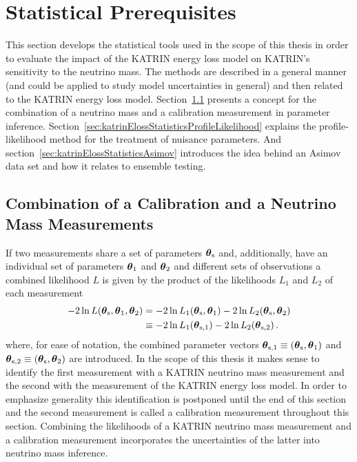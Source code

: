 \def\currentRootFolder{chapter/sensitivityStudyWithPreliminaryKatrinElossModel/statisticalPrerequisites}
\def\currentFigureFolder{\currentRootFolder/fig}



\section{Statistical Prerequisites}
\label{sec:katrinElossStatistics}
This section develops the statistical tools used in the scope of this thesis in order to evaluate the impact of the KATRIN energy loss model on KATRIN's sensitivity to the neutrino mass. The methods are described in a general manner (and could be applied to study model uncertainties in general) and then related to the KATRIN energy loss model. Section~\ref{sec:katrinElossStatisticsCombMeasurements} presents a concept for the combination of a neutrino mass and a calibration measurement in parameter inference. Section~\ref{sec:katrinElossStatisticsProfileLikelihood} explains the profile-likelihood method for the treatment of nuisance parameters. And section~\ref{sec:katrinElossStatisticsAsimov} introduces the idea behind an Asimov data set and how it relates to ensemble testing.

\subsection{Combination of a Calibration and a Neutrino Mass Measurements}
\label{sec:katrinElossStatisticsCombMeasurements}
If two measurements share a set of parameters $\boldsymbol{\mathbf{\theta}}_\mathrm{s}$ and, additionally, have an individual set of parameters $\boldsymbol{\mathbf{\theta}}_1$ and $\boldsymbol{\mathbf{\theta}}_2$ and different sets of observations a combined likelihood $L$ is given by the product of the likelihoods $L_1$ and $L_2$ of each measurement~\cite{ReviewOfParticlePhysics}
\newcommand{\paramVecSOne}{\paramVec_\mathrm{s,1}}
\newcommand{\paramVecSTwo}{\paramVec_\mathrm{s,2}}
\begin{align}
-2\ln L(\paramVecShared, \paramVec_1, \paramVec_2) &=  
-2\ln L_1(\paramVecShared, \paramVec_1)
-2\ln L_2(\paramVecShared, \paramVec_2)
\nonumber \\
&\equiv
-2\ln L_1(\paramVecSOne)
-2\ln L_2(\paramVecSTwo)
\fullstop
\end{align}
where, for ease of notation, the combined parameter vectors $\boldsymbol{\mathbf{\theta}}_\mathrm{s,1}\equiv(\boldsymbol{\mathbf{\theta}}_\mathrm{s},\boldsymbol{\mathbf{\theta}}_1)$ and 
$\boldsymbol{\mathbf{\theta}}_\mathrm{s,2}\equiv(\boldsymbol{\mathbf{\theta}}_\mathrm{s},\boldsymbol{\mathbf{\theta}}_2)$ are introduced. In the scope of this thesis it makes sense to identify the first measurement with a KATRIN neutrino mass measurement and the second with the measurement of the KATRIN energy loss model. In order to emphasize generality this identification is postponed until the end of this section and the second measurement is called a calibration measurement throughout this section. Combining the likelihoods of a KATRIN neutrino mass measurement and a calibration measurement incorporates the uncertainties of the latter into neutrino mass inference. 


